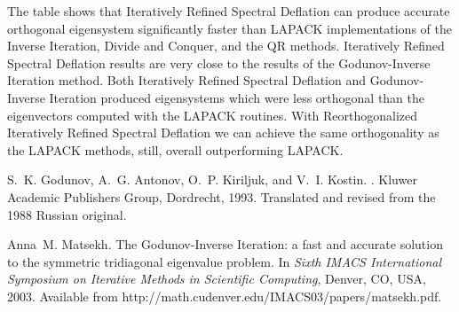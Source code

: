 \documentclass{report}
\begin{document}
\begin{table}[hbtp]
\centering
{}
\label{tbl:TestNew}
\end{table}

The table shows that Iteratively Refined Spectral Deflation can produce
accurate orthogonal eigensystem significantly faster than LAPACK
implementations of the Inverse Iteration, Divide and Conquer, and
the QR methods. Iteratively Refined Spectral Deflation results are very
close to the results of the Godunov-Inverse Iteration
method. Both Iteratively Refined Spectral Deflation and Godunov-Inverse
Iteration produced eigensystems which were less orthogonal than
the eigenvectors computed with the LAPACK routines. With
Reorthogonalized Iteratively Refined Spectral Deflation we can achieve the
same orthogonality as the LAPACK methods, still, overall
outperforming LAPACK.

\begin{thebibliography}{GAKK93}

S.~K. Godunov, A.~G. Antonov, O.~P. Kiriljuk, and V.~I. Kostin.
.
\newblock Kluwer Academic Publishers Group, Dordrecht, 1993.
\newblock Translated and revised from the 1988 Russian original.

Anna~M. Matsekh.
\newblock The {G}odunov-Inverse Iteration: {a} fast and accurate solution to
the symmetric tridiagonal eigenvalue problem.
\newblock In {\em Sixth IMACS International Symposium on Iterative
Methods in Scientific Computing}, Denver, CO, USA, 2003.
\newblock Available from http://math.cudenver.edu/IMACS03/papers/matsekh.pdf.

\end{thebibliography}
\end{document}
